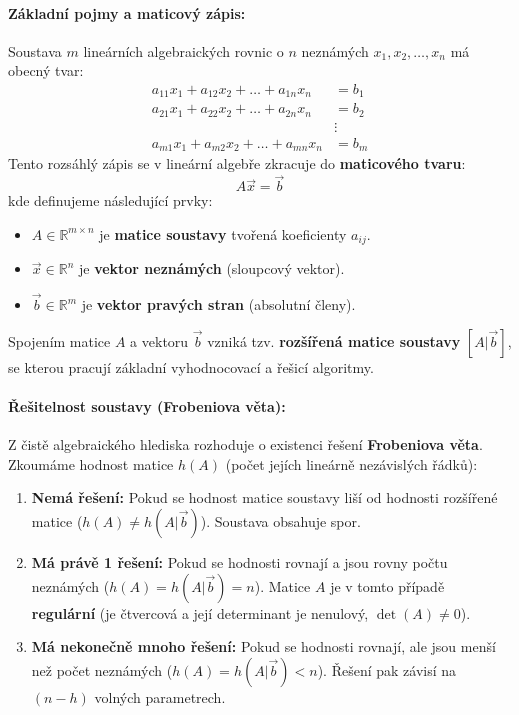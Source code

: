 \paragraph*{Základní pojmy a maticový zápis:}
Soustava $m$ lineárních algebraických rovnic o $n$ neznámých $x_1, x_2, \dots, x_n$ má obecný tvar:
\begin{align*}
    a_{11}x_1 + a_{12}x_2 + \dots + a_{1n}x_n &= b_1 \\
    a_{21}x_1 + a_{22}x_2 + \dots + a_{2n}x_n &= b_2 \\
    &\vdots \\
    a_{m1}x_1 + a_{m2}x_2 + \dots + a_{mn}x_n &= b_m
\end{align*}
Tento rozsáhlý zápis se v lineární algebře zkracuje do \textbf{maticového tvaru}:
\[ A \vec{x} = \vec{b} \]
kde definujeme následující prvky:
\begin{itemize}
    \item $A \in \mathbb{R}^{m \times n}$ je \textbf{matice soustavy} tvořená koeficienty $a_{ij}$.
    \item $\vec{x} \in \mathbb{R}^n$ je \textbf{vektor neznámých} (sloupcový vektor).
    \item $\vec{b} \in \mathbb{R}^m$ je \textbf{vektor pravých stran} (absolutní členy).
\end{itemize}
Spojením matice $A$ a vektoru $\vec{b}$ vzniká tzv. \textbf{rozšířená matice soustavy} $[A | \vec{b}]$, se kterou pracují základní vyhodnocovací a řešicí algoritmy.

\paragraph*{Řešitelnost soustavy (Frobeniova věta):}
Z čistě algebraického hlediska rozhoduje o existenci řešení \textbf{Frobeniova věta}. Zkoumáme hodnost matice $h(A)$ (počet jejích lineárně nezávislých řádků):
\begin{enumerate}
    \item \textbf{Nemá řešení:} Pokud se hodnost matice soustavy liší od hodnosti rozšířené matice ($h(A) \neq h(A|\vec{b})$). Soustava obsahuje spor.
    \item \textbf{Má právě 1 řešení:} Pokud se hodnosti rovnají a jsou rovny počtu neznámých ($h(A) = h(A|\vec{b}) = n$). Matice $A$ je v tomto případě \textbf{regulární} (je čtvercová a její determinant je nenulový, $\det(A) \neq 0$).
    \item \textbf{Má nekonečně mnoho řešení:} Pokud se hodnosti rovnají, ale jsou menší než počet neznámých ($h(A) = h(A|\vec{b}) < n$). Řešení pak závisí na $(n - h)$ volných parametrech.
\end{enumerate}

